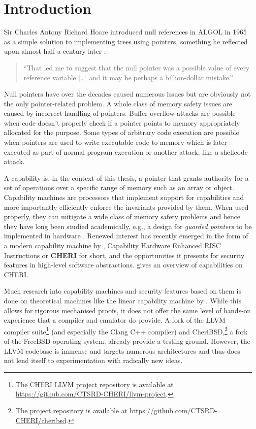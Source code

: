 \documentclass[main.tex]{subfiles}
\begin{document}
\onlyinsubfile{\mainmatter{}}

\chapter{Introduction}
Sir Charles Antony Richard Hoare introduced null references in ALGOL in 1965 as a simple solution to implementing trees using pointers, something he reflected upon almost half a century later \citep{null}:
\begin{quote}
	\enquote{That led me to suggest that the null pointer was a possible value of every reference variable […] and it may be perhaps a billion-dollar mistake.}
\end{quote}

Null pointers have over the decades caused numerous issues but are obviously not the only pointer-related problem. A whole class of memory safety issues are caused by incorrect handling of pointers. Buffer overflow attacks are possible when code doesn't properly check if a pointer points to memory appropriately allocated for the purpose. Some types of arbitrary code execution are possible when pointers are used to write executable code to memory which is later executed as part of normal program execution or another attack, like a shellcode attack.

A capability is, in the context of this thesis, a pointer that grants authority for a set of operations over a specific range of memory such as an array or object. Capability machines are processors that implement support for capabilities and more importantly efficiently enforce the invariants provided by them. When used properly, they can mitigate a wide class of memory safety problems and hence they have long been studied academically, e.g., a design for \emph{guarded pointers} to be implemented in hardware \citep{guardedptrs}. Renewed interest has recently emerged in the form of a modern capability machine by \citet{intro2cheri}, Capability Hardware Enhanced RISC Instructions or \textbf{CHERI} for short, and the opportunities it presents for security features in high-level software abstractions.  gives an overview of capabilities on CHERI.

Much research into capability machines and security features based on them is done on theoretical machines like the linear capability machine by \citet{stktokens}. While this allows for rigorous mechanised proofs, it does not offer the same level of hands-on experience that a compiler and emulator do provide. A fork of the LLVM compiler suite\footnote{The CHERI LLVM project repository is available at \url{https://github.com/CTSRD-CHERI/llvm-project}.} (and especially the Clang C++ compiler) and CheriBSD,\footnote{The project repository is available at \url{https://github.com/CTSRD-CHERI/cheribsd}.} a fork of the FreeBSD operating system, already provide a testing ground. However, the LLVM codebase is immense and targets numerous architectures and thus does not lend itself to experimentation with radically new ideas.
\end{document}
